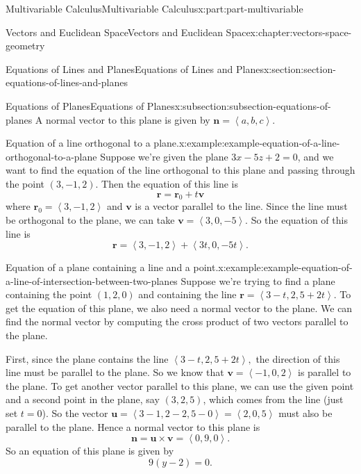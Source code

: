 \documentclass[twoside,10pt,]{book}
\numberwithin{equation}{part}
\newcommand{\dotprod}[1]{\left\langle #1 \right\rangle}
\begin{document}
\begin{partptx}{Multivariable Calculus}{}{Multivariable Calculus}{}{}{x:part:part-multivariable}
\begin{chapterptx}{Vectors and Euclidean Space}{}{Vectors and Euclidean Space}{}{}{x:chapter:vectors-space-geometry}
\begin{sectionptx}{Equations of Lines and Planes}{}{Equations of Lines and Planes}{}{}{x:section:section-equations-of-lines-and-planes}
\begin{subsectionptx}{Equations of Planes}{}{Equations of Planes}{}{}{x:subsection:subsection-equations-of-planes}
A normal vector to this plane is given by \(\mathbf{n} = \dotprod{a,b,c}\).%
\begin{example}{Equation of a line orthogonal to a plane.}{x:example:example-equation-of-a-line-orthogonal-to-a-plane}%
Suppose we're given the plane \(3x-5z+2 = 0\), and we want to find the equation of the line orthogonal to this plane and passing through the point \((3,-1,2)\). Then the equation of this line is%
%
\begin{equation*}
\mathbf{r} = \mathbf{r}_{0}+t\mathbf{v}
\end{equation*}
where \(\mathbf{r}_{0} = \dotprod{3,-1,2}\) and \(\mathbf{v}\) is a vector parallel to the line. Since the line must be orthogonal to the plane, we can take \(\mathbf{v} = \dotprod{3,0,-5}\). So the equation of this line is%
%
\begin{equation*}
\mathbf{r} = \dotprod{3,-1,2}+\dotprod{3t,0,-5t}.
\end{equation*}
\end{example}
\begin{example}{Equation of a plane containing a line and a point.}{x:example:example-equation-of-a-line-of-intersection-between-two-planes}%
Suppose we're trying to find a plane containing the point \((1,2,0)\) and containing the line \(\mathbf{r} = \dotprod{3-t,2,5+2t}\). To get the equation of this plane, we also need a normal vector to the plane. We can find the normal vector by computing the cross product of two vectors parallel to the plane.%
\par
First, since the plane contains the line \(\dotprod{3-t,2,5+2t},\) the direction of this line must be parallel to the plane. So we know that \(\mathbf{v} = \dotprod{-1,0,2}\) is parallel to the plane. To get another vector parallel to this plane, we can use the given point and a second point in the plane, say \((3,2,5)\), which comes from the line (just set \(t=0\)). So the vector \(\mathbf{u} = \dotprod{3-1,2-2,5-0} = \dotprod{2,0,5}\) must also be parallel to the plane. Hence a normal vector to this plane is%
%
\begin{equation*}
\mathbf{n} = \mathbf{u}\times\mathbf{v} = \dotprod{0,9,0}.
\end{equation*}
So an equation of this plane is given by%
%
\begin{equation*}
9(y-2) = 0.
\end{equation*}
\end{example}
\end{subsectionptx}
\end{sectionptx}

\end{chapterptx}
\end{partptx}
\end{document}
